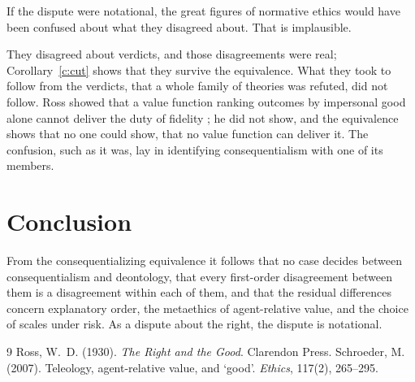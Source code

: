 \documentclass{situationist-preprint}
\begin{document}
\begin{objection}
If the dispute were notational, the great figures of normative ethics would have been confused about what they disagreed about. That is implausible.
\end{objection}

\begin{reply}
They disagreed about verdicts, and those disagreements were real; Corollary~\ref{c:cut} shows that they survive the equivalence. What they took to follow from the verdicts, that a whole family of theories was refuted, did not follow. Ross showed that a value function ranking outcomes by impersonal good alone cannot deliver the duty of fidelity \citep{Ross1930}; he did not show, and the equivalence shows that no one could show, that no value function can deliver it. The confusion, such as it was, lay in identifying consequentialism with one of its members.
\end{reply}

\section{Conclusion}

From the consequentializing equivalence it follows that no case decides between consequentialism and deontology, that every first-order disagreement between them is a disagreement within each of them, and that the residual differences concern explanatory order, the metaethics of agent-relative value, and the choice of scales under risk. As a dispute about the right, the dispute is notational.

\begin{thebibliography}{9}\small
{} Ross, W.~D. (1930). \emph{The Right and the Good}. Clarendon Press.
 Schroeder, M. (2007). Teleology, agent-relative value, and `good'. \emph{Ethics}, 117(2), 265--295.
\end{thebibliography}
\end{document}
